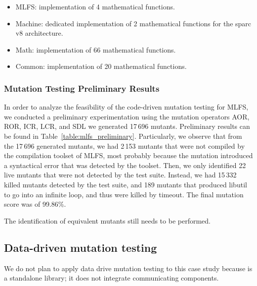 \begin{itemize}
	\item MLFS: implementation of 4 mathematical functions.
	\item Machine: dedicated implementation of 2 mathematical functions for the sparc v8 architecture.
	\item Math: implementation of 66 mathematical functions.
	\item Common: implementation of 20 mathematical functions.
\end{itemize}

\subsubsection{Mutation Testing Preliminary Results}



In order to analyze the feasibility of the code-driven mutation testing for MLFS, we conducted a preliminary experimentation using the mutation operators AOR, ROR, ICR, LCR, and SDL we generated 17\,696 mutants. Preliminary results can be found in Table~\ref{table:mlfs_preliminary}.
Particularly, we observe that from the 17\,696 generated mutants, we had 2\,153 mutants that were not compiled by the compilation toolset of MLFS, most probably because the mutation introduced a syntactical error that was detected by the toolset.
Then, we only identified 22 live mutants that were not detected by the test suite. Instead, we had 15\,332 killed mutants detected by the test suite, and 189 mutants that produced libutil to go into an infinite loop, and thus were killed by timeout. The final mutation score was of 99.86\%.

The identification of equivalent mutants still needs to be performed.


\subsection{Data-driven mutation testing}

We do not plan to apply data drive mutation testing to this case study because is a standalone library; it does not integrate communicating components.




